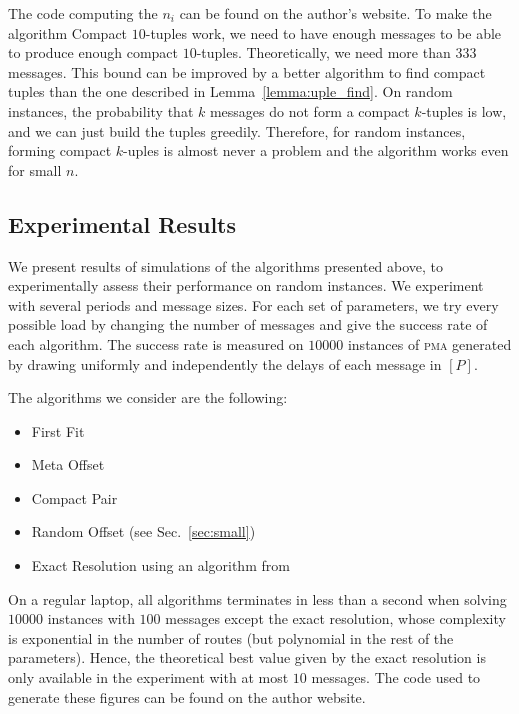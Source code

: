 \documentclass[10pt, conference, letterpaper]{IEEEtran}
\newcommand\pma{\textsc{pma}\xspace}
\begin{document}
The code computing the $n_i$ can be found on the author's website.
To make the algorithm Compact $10$-tuples work, we need to have enough messages to be able to
produce enough compact $10$-tuples. Theoretically, we need more than $333$ messages. This bound can be improved
by a better algorithm to find compact tuples than the one described in Lemma~\ref{lemma:uple_find}. On random instances, the probability that $k$ messages do not form a compact $k$-tuples is low, and we can just build the tuples greedily. Therefore, for random instances, forming compact $k$-uples is almost never a problem and the algorithm works even for small $n$.

\subsection{Experimental Results} \label{sec:perf_large}

We present results of simulations of the algorithms presented above, to experimentally assess their performance on
random instances. We experiment with several periods and message sizes. For each set of parameters, we try every possible load by changing the number of messages and give the success rate of each algorithm. The success rate is measured on $10000$ instances of \pma generated by drawing uniformly and independently the delays of each message in $[P]$. 

The algorithms we consider are the following:
\begin{itemize}
	\item First Fit
	\item Meta Offset
	\item Compact Pair
	\item Random Offset (see Sec.~\ref{sec:small})
	\item Exact Resolution using an algorithm from~\cite{dominique2018deterministic}  
\end{itemize}

On a regular laptop, all algorithms terminates in less than a second when solving $10000$ instances with $100$ messages except the exact resolution, whose complexity is exponential in the number of routes (but polynomial in the rest of the parameters). Hence, the theoretical best value given by the exact resolution is only available in the experiment with at most $10$ messages. The code used to generate these figures can be found on the author website.
\end{document}

